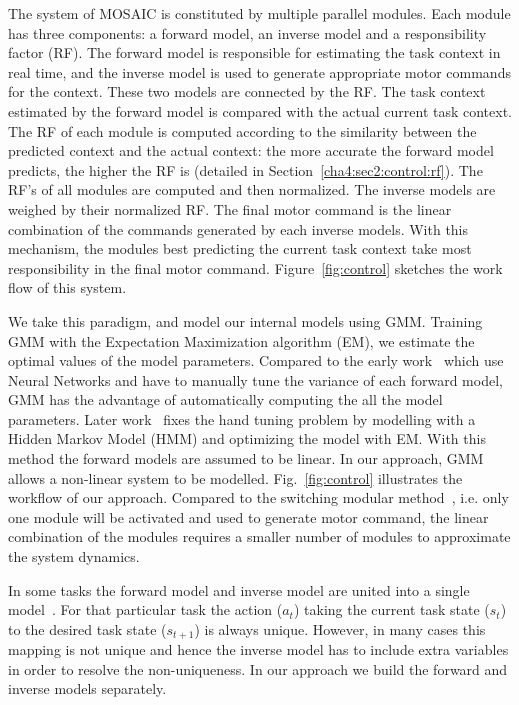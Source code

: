 The system of MOSAIC is constituted by multiple parallel modules. Each module has three components: a forward model, an inverse model and a responsibility factor (RF). The forward model is responsible for estimating the task context in real time, and the inverse model is used to generate appropriate motor commands for the context. These two models are connected by the RF. The task context estimated by the forward model is compared with the actual current task context.
The RF of each module is computed according to the similarity between the predicted context and the actual context: the more accurate the forward model predicts, the higher the RF is (detailed in Section~\ref{cha4:sec2:control:rf}). The RF's of all modules are computed and then normalized.
The inverse models are weighed by their normalized RF. The final motor command is the linear combination of the commands generated by each inverse models. With this mechanism, the modules best predicting the current task context take most responsibility in the final motor command. Figure~\ref{fig:control} sketches the work flow of this system. %

We take this paradigm, and model our internal models using GMM. Training GMM with the Expectation Maximization algorithm (EM), we estimate the optimal values of the model parameters. Compared to the early work~\cite{wolpert1998multiple} which use Neural Networks and have to manually tune the variance of each forward model, GMM has the advantage of automatically computing the all the model parameters. Later work~\cite{haruno2001mosaic} fixes the hand tuning problem by modelling with a Hidden Markov Model (HMM) and optimizing the model with EM. With this method the forward models are assumed to be linear. In our approach, GMM allows a non-linear system to be modelled. Fig.~\ref{fig:control} illustrates the workflow of our approach. Compared to the switching modular method~\cite{narendra1997adaptive}, i.e. only one module will be activated and used to generate motor command, the linear combination of the modules requires a smaller number of modules to approximate the system dynamics.

In some tasks the forward model and inverse model are united into a single model~\cite{petkos2006learning}. For that particular task the action ($a_t$) taking the current task state ($s_t$) to the desired task state ($s_{t+1}$) is always unique. However, in many cases this mapping is not unique and hence the inverse model has to include extra variables in order to resolve the non-uniqueness. In our approach we build the forward and inverse models separately.

